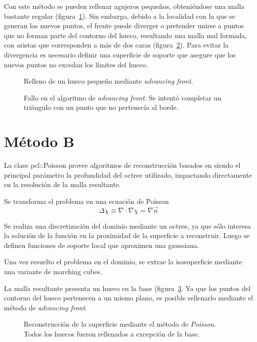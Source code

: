 		Con este método se pueden rellenar agujeros pequeños, obteniéndose una malla bastante regular (figura~\ref{fig:fill_good}).
		Sin embargo, debido a la localidad con la que se generan los nuevos
		puntos, el frente puede diverger o pretender unirse a puntos que no
		forman parte del contorno del hueco, resultando una malla mal formada,
		con aristas que corresponden a más de dos caras (figura~\ref{fig:fill_bad}).
		Para evitar la divergencia es necesario definir una superficie de
		soporte que asegure que los nuevos puntos no excedan los límites del
		hueco.

	\begin{figure}
		\caption{\label{fig:fill_good}Relleno de un hueco pequeño mediante \emph{advancing front}.}
	\end{figure}

	\begin{figure}
		\caption{\label{fig:fill_bad}Fallo en el algoritmo de \emph{advancing front}. Se intentó completar un triángulo con un punto que no pertenecía al borde.}
	\end{figure}

	\section{Método B}
	La clase pcl::Poisson provee algoritmos de reconstrucción basados en \cite{Kazhdan:2006:PSR:1281957.1281965} %
	siendo el principal parámetro la profundidad del octree utilizado,
	impactando directamente en la resolución de la malla resultante.


	Se transforma el problema en una ecuación de Poisson
	\[\Delta\chi \equiv \nabla \cdot\nabla\chi = \nabla \vec{n}\]

	Se realiza una discretización del dominio mediante un octree, ya que sólo
	interesa la solución de la función en la proximidad de la superficie a
	reconstruir.
	Luego se definen funciones de soporte local que aproximen una gaussiana.

	Una vez resuelto el problema en el dominio, se extrae la isosuperficie mediante una variante de marching cubes.

	La malla resultante presenta un hueco en la base (figura~\ref{fig:fill_poisson}.
	Ya que los puntos del contorno del hueco pertenecen a un mismo plano, es posible rellenarlo mediante el método de \emph{advancing front}.

	\begin{figure}
		\caption{\label{fig:fill_poisson}Reconstrucción de la superficie mediante el método de \emph{Poisson}. Todos los huecos fueron rellenados a excepción de la base.}
	\end{figure}

